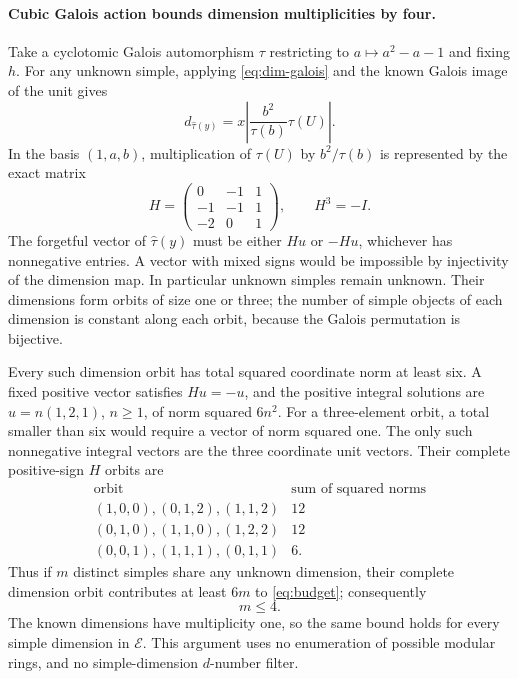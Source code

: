 \documentclass[11pt]{article}
\newcommand{\E}{\mathcal E}
\begin{document}
\paragraph{Cubic Galois action bounds dimension multiplicities by four.}
Take a cyclotomic Galois automorphism $\tau$ restricting to
$a\mapsto a^2-a-1$ and fixing $h$. For any unknown simple, applying
\eqref{eq:dim-galois} and the known Galois image of the unit gives
\[
 d_{\widehat\tau(y)}=x\left|
 \frac{b^2}{\tau(b)}\tau(U)\right|.
\]
In the basis $(1,a,b)$, multiplication of $\tau(U)$ by
$b^2/\tau(b)$ is represented by the exact matrix
\[
 H=\begin{pmatrix}0&-1&1\\-1&-1&1\\-2&0&1\end{pmatrix},
 \qquad H^3=-I.
\]
The forgetful vector of $\widehat\tau(y)$ must be either $Hu$ or $-Hu$,
whichever has nonnegative entries. A vector with mixed signs would be
impossible by injectivity of the dimension map. In particular unknown
simples remain unknown. Their dimensions form orbits of size one or three;
the number of simple objects of each dimension is constant along each
orbit, because the Galois permutation is bijective.

Every such dimension orbit has total squared coordinate norm at least six.
A fixed positive vector satisfies $Hu=-u$, and the positive integral
solutions are $u=n(1,2,1)$, $n\geq1$, of norm squared $6n^2$.
For a three-element orbit, a total smaller than six would require a vector
of norm squared one. The only such nonnegative integral vectors are the
three coordinate unit vectors. Their complete positive-sign $H$ orbits are
\[
\begin{array}{c|c}
 \text{orbit}&\text{sum of squared norms}\\\hline
 (1,0,0),(0,1,2),(1,1,2)&12\\
 (0,1,0),(1,1,0),(1,2,2)&12\\
 (0,0,1),(1,1,1),(0,1,1)&6.
\end{array}
\]
Thus if $m$ distinct simples share any unknown dimension, their complete
dimension orbit contributes at least $6m$ to \eqref{eq:budget}; consequently
\begin{equation}
 m\leq4.
 \label{eq:four}
\end{equation}
The known dimensions have multiplicity one, so the same bound holds for
every simple dimension in $\E$. This argument uses no enumeration of
possible modular rings, and no simple-dimension $d$-number filter.
\end{document}
